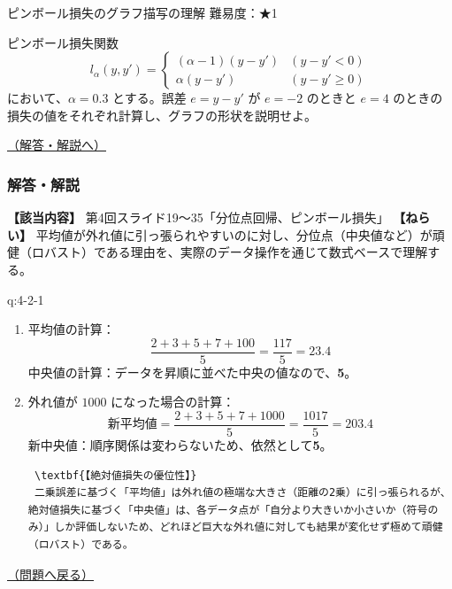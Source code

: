 \begin{questionbox}[label=q:4-2-2]{ピンボール損失のグラフ描写の理解 \hfill \normalfont \small 難易度：★1}

ピンボール損失関数 \[
l_\alpha(y, y') = 
\begin{cases}
(\alpha - 1)(y - y') & (y - y' < 0) \\
\alpha(y - y') & (y - y' \ge 0)
\end{cases}
\] において、\(\alpha = 0.3\) とする。誤差 \(e = y - y'\) が \(e = -2\)
のときと \(e = 4\)
のときの損失の値をそれぞれ計算し、グラフの形状を説明せよ。

\hfill 

\hyperref[a:4-2-2]{（解答・解説へ）}

\end{questionbox}

\subsubsection{解答・解説}\label{ux89e3ux7b54ux89e3ux8aac-11}

\textbf{【該当内容】} 第4回スライド19〜35「分位点回帰、ピンボール損失」
\textbf{【ねらい】}
平均値が外れ値に引っ張られやすいのに対し、分位点（中央値など）が頑健（ロバスト）である理由を、実際のデータ操作を通じて数式ベースで理解する。

\begin{answerbox}[phantomlabel=a:4-2-1]{q:4-2-1}

\begin{enumerate}
\def\labelenumi{\arabic{enumi}.}
\item
  平均値の計算： \[
       \frac{2 + 3 + 5 + 7 + 100}{5} = \frac{117}{5} = 23.4
       \] 中央値の計算：データを昇順に並べた中央の値なので、\textbf{5}。
\item
  外れ値が \(1000\) になった場合の計算： \[
       \text{新平均値} = \frac{2 + 3 + 5 + 7 + 1000}{5} = \frac{1017}{5} = 203.4
       \] 新中央値：順序関係は変わらないため、依然として\textbf{5}。

\begin{verbatim}
 \textbf{【絶対値損失の優位性】}
 二乗誤差に基づく「平均値」は外れ値の極端な大きさ（距離の2乗）に引っ張られるが、絶対値損失に基づく「中央値」は、各データ点が「自分より大きいか小さいか（符号のみ）」しか評価しないため、どれほど巨大な外れ値に対しても結果が変化せず極めて頑健（ロバスト）である。
\end{verbatim}
\end{enumerate}

\hfill 

\hyperref[q:4-2-1]{（問題へ戻る）}

\end{answerbox}

